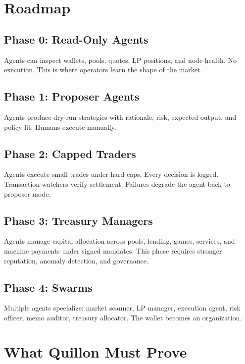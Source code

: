 \documentclass[11pt,a4paper]{article}
\begin{document}
\section{Roadmap}

\subsection{Phase 0: Read-Only Agents}

Agents can inspect wallets, pools, quotes, LP positions, and node health. No execution. This is where operators learn the shape of the market.

\subsection{Phase 1: Proposer Agents}

Agents produce dry-run strategies with rationale, risk, expected output, and policy fit. Humans execute manually.

\subsection{Phase 2: Capped Traders}

Agents execute small trades under hard caps. Every decision is logged. Transaction watchers verify settlement. Failures degrade the agent back to proposer mode.

\subsection{Phase 3: Treasury Managers}

Agents manage capital allocation across pools, lending, games, services, and machine payments under signed mandates. This phase requires stronger reputation, anomaly detection, and governance.

\subsection{Phase 4: Swarms}

Multiple agents specialize: market scanner, LP manager, execution agent, risk officer, memo auditor, treasury allocator. The wallet becomes an organization.

\section{What Quillon Must Prove}
\end{document}
